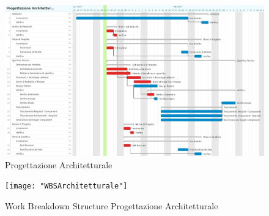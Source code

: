 \documentclass[12pt,a4paper,titlepage]{article}
\begin{document}
	\begin{figure}[p]
		\centering
		\includegraphics[width=1\linewidth]{"Gantt Progettazione Architetturale"}
		\caption{Progettazione Architetturale}
		\label{fig:gantt-progettazione-architetturale}
	\end{figure}

	\begin{figure}[p]
		\centering
		\texttt{[image: "WBSArchitetturale"]}
		\caption{Work Breakdown Structure Progettazione Architetturale}
		\label{fig:WBSArchitetturale}
	\end{figure}
\end{document}
